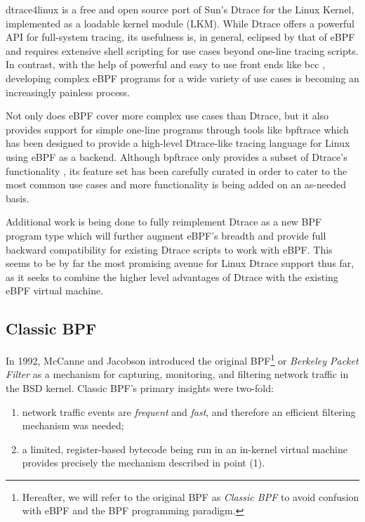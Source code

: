 \documentclass[
  12pt]{findlay}
\providecommand{\tightlist}{\setlength{\itemsep}{0pt}\setlength{\parskip}{0pt}}
\begin{document}
dtrace4linux \autocite{dtrace4linux} is a free and open source port of
Sun's Dtrace \autocite{cantrill04} for the Linux Kernel, implemented as
a loadable kernel module (LKM). While Dtrace offers a powerful API for
full-system tracing, its usefulness is, in general, eclipsed by that of
eBPF \autocite{gregg18} and requires extensive shell scripting for use
cases beyond one-line tracing scripts. In contrast, with the help of
powerful and easy to use front ends like bcc \autocite{bcc}, developing
complex eBPF programs for a wide variety of use cases is becoming an
increasingly painless process.

Not only does eBPF cover more complex use cases than Dtrace, but it also
provides support for simple one-line programs through tools like
bpftrace \autocite{gregg18,bpftrace} which has been designed to provide
a high-level Dtrace-like tracing language for Linux using eBPF as a
backend. Although bpftrace only provides a subset of Dtrace's
functionality \autocite{gregg18}, its feature set has been carefully
curated in order to cater to the most common use cases and more
functionality is being added on an as-needed basis.

Additional work is being done to fully reimplement Dtrace as a new BPF
program type \autocite{vanhees19} which will further augment eBPF's
breadth and provide full backward compatibility for existing Dtrace
scripts to work with eBPF. This seems to be by far the most promising
avenue for Linux Dtrace support thus far, as it seeks to combine the
higher level advantages of Dtrace with the existing eBPF virtual
machine.

\FloatBarrier

\hypertarget{classic-bpf}{%
\subsection{Classic BPF}\label{classic-bpf}}

In 1992, McCanne and Jacobson \autocite{bpf} introduced the original
BPF\footnote{Hereafter,
we will refer to the original BPF as {\itshape Classic BPF} to avoid confusion with eBPF and the BPF programming paradigm.}
or \emph{Berkeley Packet Filter} as a mechanism for capturing,
monitoring, and filtering network traffic in the BSD kernel. Classic
BPF's primary insights were two-fold:

\begin{enumerate}
\def\labelenumi{\arabic{enumi})}
\tightlist
\item
  network traffic events are \emph{frequent} and \emph{fast}, and
  therefore an efficient filtering mechanism was needed;
\item
  a limited, register-based bytecode being run in an in-kernel virtual
  machine provides precisely the mechanism described in point (1).
\end{enumerate}
\end{document}
